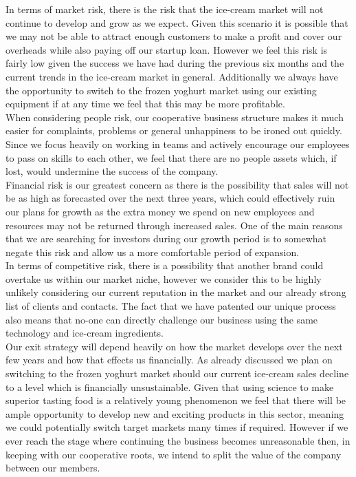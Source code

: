 \documentclass{article}
\begin{document}
In terms of market risk, there is the risk that the ice-cream market will not continue to develop and grow as we expect. Given this scenario it is possible that we may not be able to attract enough customers to make a profit and cover our overheads while also paying off our startup loan. However we feel this risk is fairly low given the success we have had during the previous six months and the current trends in the ice-cream market in general. Additionally we always have the opportunity to switch to the frozen yoghurt market using our existing equipment if at any time we feel that this may be more profitable. \\

When considering people risk, our cooperative business structure makes it much easier for complaints, problems or general unhappiness to be ironed out quickly. Since we focus heavily on working in teams and actively encourage our employees to pass on skills to each other, we feel that there are no people assets which, if lost, would undermine the success of the company. \\

Financial risk is our greatest concern as there is the possibility that sales will not be as high as forecasted over the next three years, which could effectively ruin our plans for growth as the extra money we spend on new employees and resources may not be returned through increased sales. One of the main reasons that we are searching for investors during our growth period is to somewhat negate this risk and allow us a more comfortable period of expansion. \\

In terms of competitive risk, there is a possibility that another brand could overtake us within our market niche, however we consider this to be highly unlikely considering our current reputation in the market and our already strong list of clients and contacts. The fact that we have patented our unique process also means that no-one can directly challenge our business using the same technology and ice-cream ingredients. \\

Our exit strategy will depend heavily on how the market develops over the next few years and how that effects us financially. As already discussed we plan on switching to the frozen yoghurt market should our current ice-cream sales decline to a level which is financially unsustainable. Given that using science to make superior tasting food is a relatively young phenomenon we feel that there will be ample opportunity to develop new and exciting products in this sector, meaning we could potentially switch target markets many times if required. However if we ever reach the stage where continuing the business becomes unreasonable then, in keeping with our cooperative roots, we intend to split the value of the company between our members.
\end{document}
